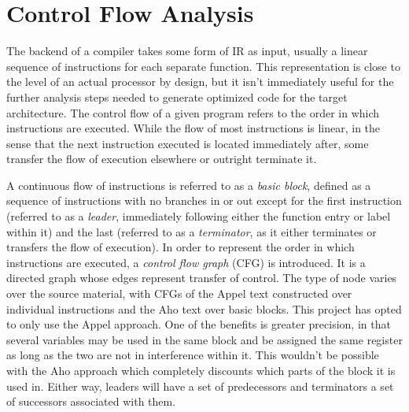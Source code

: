 \documentclass{article}
\begin{document}

\section{Control Flow Analysis}



The backend of a compiler takes some form of IR as input, usually a linear sequence of instructions for each separate function. This representation is close to the level of an actual processor by design, but it isn't immediately useful for the further analysis steps needed to generate optimized code for the target architecture. %
The control flow of a given program refers to the order in which instructions are executed. While the flow of most instructions is linear, in the sense that the next instruction executed is located immediately after, some transfer the flow of execution elsewhere or outright terminate it. %


A continuous flow of instructions is referred to as a \textit{basic block}, defined as a sequence of instructions with no branches in or out except for the first instruction (referred to as a \textit{leader}, immediately following either the function entry or label within it) and the last (referred to as a \textit{terminator}, as it either terminates or transfers the flow of execution). %
In order to represent the order in which instructions are executed, a \textit{control flow graph} (CFG) is introduced. It is a directed graph whose edges represent transfer of control. The type of node varies over the source material, with CFGs of the Appel text \cite{tiger} constructed over individual instructions  and the Aho text \cite{dragon} over basic blocks.
This project has opted to only use the Appel approach. One of the benefits is greater precision, in that several variables may be used in the same block and be assigned the same register as long as the two are not in interference within it. This wouldn't be possible with the Aho approach which completely discounts which parts of the block it is used in.
Either way, leaders will have a set of predecessors and terminators a set of successors associated with them.
\end{document}
